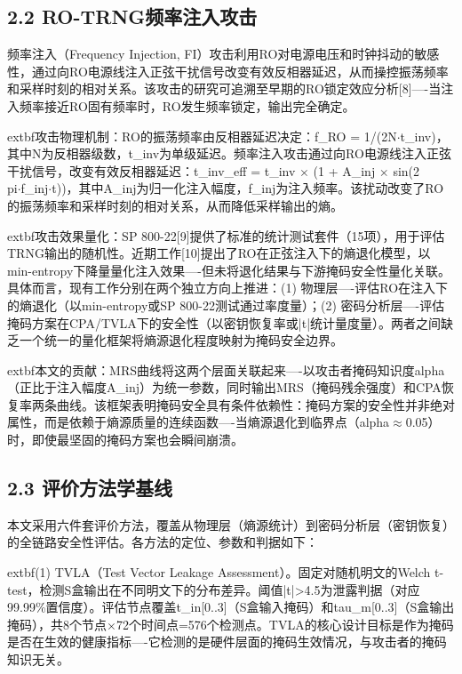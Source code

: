 \documentclass[journal]{IEEEtran}
\begin{document}
\subsection{2.2 RO-TRNG频率注入攻击}

频率注入（Frequency Injection, FI）攻击利用RO对电源电压和时钟抖动的敏感性，通过向RO电源线注入正弦干扰信号改变有效反相器延迟，从而操控振荡频率和采样时刻的相对关系。该攻击的研究可追溯至早期的RO锁定效应分析[8]----当注入频率接近RO固有频率时，RO发生频率锁定，输出完全确定。

	extbf{攻击物理机制}：RO的振荡频率由反相器延迟决定：f\_RO = 1/(2N$\cdot$t\_inv)，其中N为反相器级数，t\_inv为单级延迟。频率注入攻击通过向RO电源线注入正弦干扰信号，改变有效反相器延迟：t\_inv\_eff = t\_inv $\times$ (1 + A\_inj $\times$ sin(2\\pi$\cdot$f\_inj$\cdot$t))，其中A\_inj为归一化注入幅度，f\_inj为注入频率。该扰动改变了RO的振荡频率和采样时刻的相对关系，从而降低采样输出的熵。

	extbf{攻击效果量化}：SP 800-22[9]提供了标准的统计测试套件（15项），用于评估TRNG输出的随机性。近期工作[10]提出了RO在正弦注入下的熵退化模型，以min-entropy下降量量化注入效果----但未将退化结果与下游掩码安全性量化关联。具体而言，现有工作分别在两个独立方向上推进：(1) 物理层----评估RO在注入下的熵退化（以min-entropy或SP 800-22测试通过率度量）；(2) 密码分析层----评估掩码方案在CPA/TVLA下的安全性（以密钥恢复率或|t|统计量度量）。两者之间缺乏一个统一的量化框架将熵源退化程度映射为掩码安全边界。

	extbf{本文的贡献}：MRS曲线将这两个层面关联起来----以攻击者掩码知识度alpha（正比于注入幅度A\_inj）为统一参数，同时输出MRS（掩码残余强度）和CPA恢复率两条曲线。该框架表明掩码安全具有条件依赖性：掩码方案的安全性并非绝对属性，而是依赖于熵源质量的连续函数----当熵源退化到临界点（alpha$\approx$0.05）时，即使最坚固的掩码方案也会瞬间崩溃。

\subsection{2.3 评价方法学基线}

本文采用六件套评价方法，覆盖从物理层（熵源统计）到密码分析层（密钥恢复）的全链路安全性评估。各方法的定位、参数和判据如下：

	extbf{(1) TVLA（Test Vector Leakage Assessment）}。固定对随机明文的Welch t-test，检测S盒输出在不同明文下的分布差异。阈值|t|>4.5为泄露判据（对应99.99\%置信度）。评估节点覆盖t\_in[0..3]（S盒输入掩码）和tau\_m[0..3]（S盒输出掩码），共8个节点$\times$72个时间点=576个检测点。TVLA的核心设计目标是作为掩码是否在生效的健康指标----它检测的是硬件层面的掩码生效情况，与攻击者的掩码知识无关。
\end{document}
